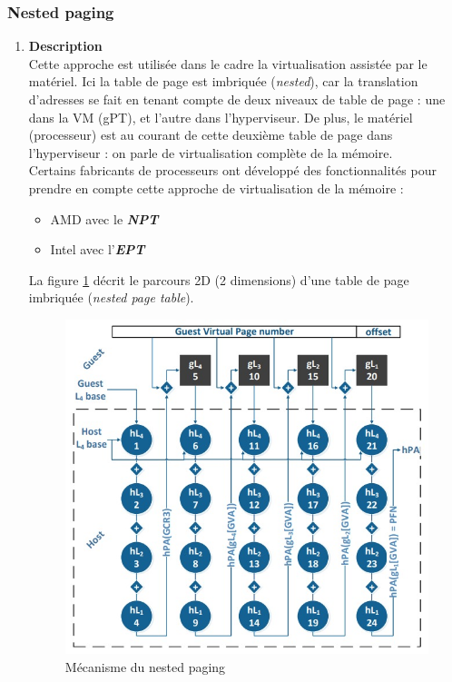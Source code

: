 \subsubsection{Nested paging}
\label{subsubsection:nested_paging}
\begin{enumerate}[label=\textbf{(\roman*)}]
    \item \textbf{Description}\\
    Cette approche est utilisée dans le cadre la virtualisation assistée par le matériel. Ici la table de page est imbriquée (\textit{nested}), car la translation d'adresses se fait en tenant compte de deux niveaux de table de page : une dans la VM (\acs{gPT}), et l'autre dans l'hyperviseur. De plus, le matériel (processeur) est au courant de cette deuxième table de page dans l'hyperviseur : on parle de virtualisation complète de la mémoire.\\
    Certains fabricants de processeurs ont développé des fonctionnalités pour prendre en compte cette approche de virtualisation de la mémoire :
    \begin{itemize}
        \item AMD avec le \textit{\textbf{\ac{NPT}}}
        \item Intel avec l'\textit{\textbf{\ac{EPT}}}
    \end{itemize}
    
    La figure \ref{fig:parcours_2D} décrit le parcours 2D (2 dimensions) d'une table de page imbriquée (\textit{nested page table}).
    \begin{figure}[htp]
        \centering
        \includegraphics[scale=.65]{chapters/1/fig1/nested_paging}
        \caption{Mécanisme du nested paging}
        \label{fig:parcours_2D}
    \end{figure}


\end{enumerate}
